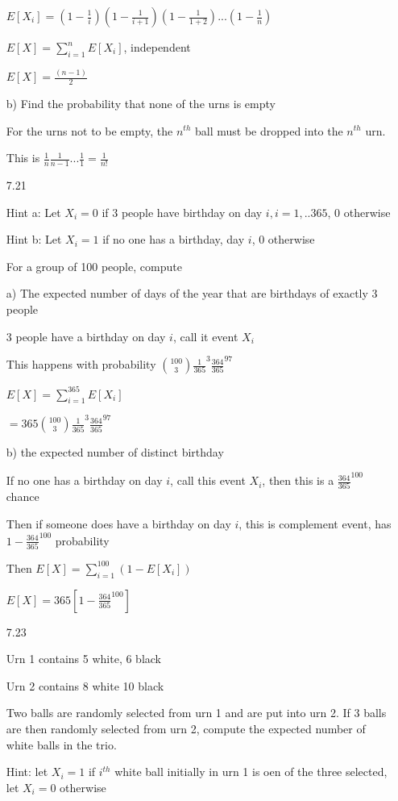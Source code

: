 \documentclass[11pt]{article}
\begin{document}
\begin{itemize}
		$E[X_i] = (1 - \frac{1}{i})(1- \frac{1}{i+1})(1-\frac{1}{1+2})...(1-\frac{1}{n})$

		$E[X] = \sum_{i=1}^{n} E[X_i]$, independent

		$E[X] = \frac{(n-1)}{2}$

	b) Find the probability that none of the urns is empty

		For the urns not to be empty, the $n^{th}$ ball must be dropped into the $n^{th}$ urn.

		This is $\frac{1}{n} \frac{1}{n-1} ... \frac{1}{1} = \frac{1}{n!}$


	\item[7.21]

		Hint a: Let $X_i = 0$ if 3 people have birthday on day $i, i = 1,..365$, 0 otherwise

		Hint b: Let $X_i = 1$ if no one has a birthday, day $i$, 0 otherwise

	For a group of 100 people, compute

	a) The expected number of days of the year that are birthdays of exactly 3 people

	3 people have a birthday on day $i$, call it event $X_i$

	This happens with probability $\binom{100}{3}\frac{1}{365}^3 \frac{364}{365}^{97}$

	$E[X] = \sum_{i=1}^{365} E[X_i]$

	$= 365 \binom{100}{3} \frac{1}{365}^3 \frac{364}{365}^{97}$

	b) the expected number of distinct birthday

	If no one has a birthday on day $i$, call this event $X_i$, then this is a $\frac{364}{365}^{100}$ chance

	Then if someone does have a birthday on day $i$, this is complement event, has $1- \frac{364}{365}^{100}$ probability

	Then $E[X] = \sum_{i=1}^{100} (1-E[X_i])$

	$E[X] = 365[1-\frac{364}{365}^{100}]$

	\item[7.23]

		Urn 1 contains 5 white, 6 black

		Urn 2 contains 8 white 10 black

		Two balls are randomly selected from urn 1 and are put into urn 2. If 3 balls are then randomly selected from urn 2, compute the expected number of white balls in the trio.

		Hint: let $X_i = 1$ if $i^{th}$ white ball initially in urn 1 is oen of the three selected, let $X_i = 0$ otherwise


\end{itemize}
\end{document}
